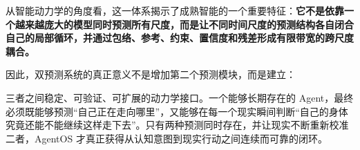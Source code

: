 从智能动力学的角度看，这一体系揭示了成熟智能的一个重要特征：\textbf{它不是依靠一个越来越庞大的模型同时预测所有尺度，而是让不同时间尺度的预测结构各自闭合自己的局部循环，并通过包络、参考、约束、置信度和残差形成有限带宽的跨尺度耦合。}

因此，双预测系统的真正意义不是增加第二个预测模块，而是建立：

\begin{statementbox}
\centering
{}
\end{statementbox}

三者之间稳定、可验证、可扩展的动力学接口。一个能够长期存在的 Agent，最终必须既能够预测“自己正在走向哪里”，又能够在每一个现实瞬间判断“自己的身体究竟还能不能继续这样走下去”。只有两种预测同时存在，并让现实不断重新校准二者，AgentOS 才真正获得从认知意图到现实行动之间连续而可靠的闭环。
